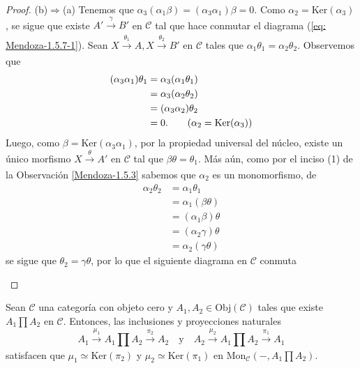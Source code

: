 \documentclass[tesis]{subfiles}
\begin{document}
\begin{proof}
    (b)$\Rightarrow$(a) Tenemos que $\alpha_3(\alpha_1\beta) = (\alpha_3\alpha_1)\beta = 0$. Como $\alpha_2=\text{Ker}(\alpha_3)$, se sigue que existe $A'\xrightarrow[]{\gamma}B'$ en $\mathscr{C}$ tal que hace conmutar el diagrama (\ref{eq: Mendoza-1.5.7-1}). Sean $X\xrightarrow[]{\theta_1}A, X\xrightarrow[]{\theta_2}B'$ en $\mathscr{C}$ tales que $\alpha_1\theta_1 = \alpha_2\theta_2$. Observemos que
    \begin{align*}
        (\alpha_3\alpha_1)\theta_1 &= \alpha_3(\alpha_1\theta_1) \\
                                   &= \alpha_3(\alpha_2\theta_2) \\
                                   &= (\alpha_3\alpha_2)\theta_2 \\
                                   &= 0. \tag{$\alpha_2 = \text{Ker}(\alpha_3)$}
    \end{align*}
    Luego, como $\beta = \text{Ker}(\alpha_3\alpha_1)$, por la propiedad universal del núcleo, existe un único morfismo $X\xrightarrow[]{\theta}A'$ en $\mathscr{C}$ tal que $\beta\theta=\theta_1$. Más aún, como por el inciso (1) de la Observación \ref{Mendoza-1.5.3} sabemos que $\alpha_2$ es un monomorfismo, de
    \begin{align*}
        \alpha_2\theta_2 &= \alpha_1\theta_1 \\
                         &= \alpha_1(\beta\theta) \\
                         &= (\alpha_1\beta)\theta \\
                         &= (\alpha_2\gamma)\theta \\
                         &= \alpha_2(\gamma\theta)
    \end{align*}
    se sigue que $\theta_2 = \gamma\theta$, por lo que el siguiente diagrama en $\mathscr{C}$ conmuta
    \begin{center}
    \end{center}
\end{proof}

\begin{Lema}\label{Mendoza-1.8.2}
    Sean $\mathscr{C}$ una categoría con objeto cero y $A_1,A_2\in\text{Obj}(\mathscr{C})$ tales que existe $A_1\prod A_2$ en $\mathscr{C}$. Entonces, las inclusiones y proyecciones naturales
    \[
        A_1\xrightarrow[]{\mu_1}A_1\prod A_2\xrightarrow[]{\pi_2}A_2 \quad \text{y} \quad A_2\xrightarrow[]{\mu_2}A_1\prod A_2\xrightarrow[]{\pi_1}A_1
    \] 
    satisfacen que $\mu_1\simeq\text{Ker}(\pi_2)$ y $\mu_2\simeq\text{Ker}(\pi_1)$ en $\text{Mon}_\mathscr{C}(-,A_1\prod A_2)$.
\end{Lema}
\end{document}
